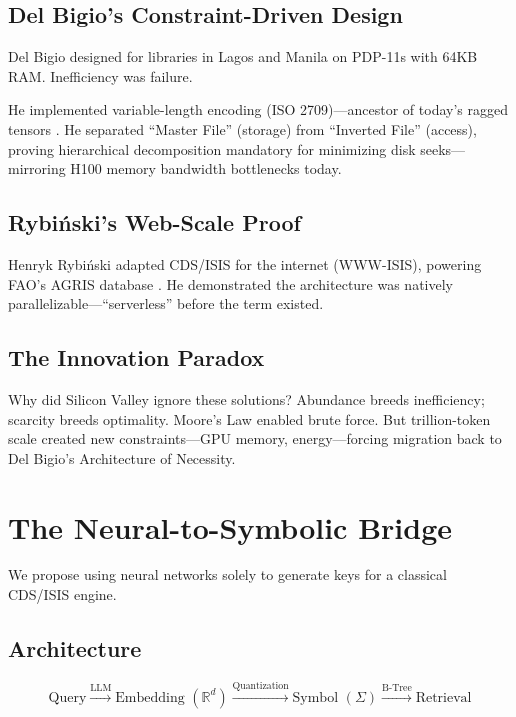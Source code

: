 \documentclass[manuscript,screen,nonacm]{acmart}
\begin{document}
\subsection{Del Bigio's Constraint-Driven Design}

Del Bigio designed for libraries in Lagos and Manila on PDP-11s with 64KB RAM. Inefficiency was failure.

He implemented variable-length encoding (ISO 2709)---ancestor of today's ragged tensors \cite{iso2709}. He separated ``Master File'' (storage) from ``Inverted File'' (access), proving hierarchical decomposition mandatory for minimizing disk seeks---mirroring H100 memory bandwidth bottlenecks today.

\subsection{Rybi\'{n}ski's Web-Scale Proof}

Henryk Rybi\'{n}ski adapted CDS/ISIS for the internet (WWW-ISIS), powering FAO's AGRIS database \cite{rybinski1999}. He demonstrated the architecture was natively parallelizable---``serverless'' before the term existed.

\subsection{The Innovation Paradox}

Why did Silicon Valley ignore these solutions? Abundance breeds inefficiency; scarcity breeds optimality. Moore's Law enabled brute force. But trillion-token scale created new constraints---GPU memory, energy---forcing migration back to Del Bigio's Architecture of Necessity.

\section{The Neural-to-Symbolic Bridge}

We propose using neural networks solely to generate keys for a classical CDS/ISIS engine.

\subsection{Architecture}

\[ \text{Query} \xrightarrow{\text{LLM}} \text{Embedding } (\mathbb{R}^d) \xrightarrow{\text{Quantization}} \text{Symbol } (\Sigma) \xrightarrow{\text{B-Tree}} \text{Retrieval} \]
\end{document}
